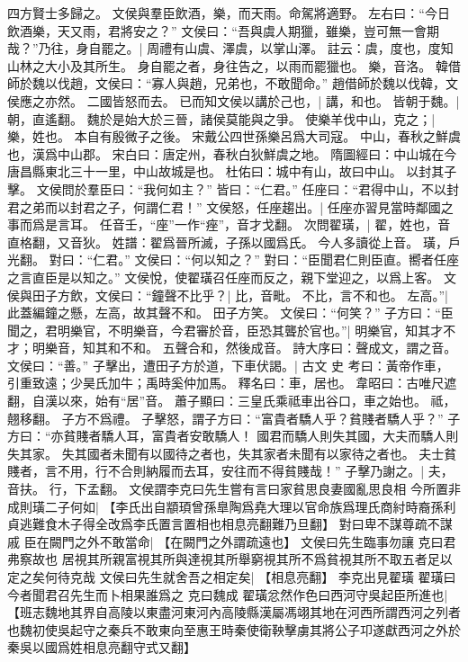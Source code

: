 四方賢士多歸之。
文侯與羣臣飲酒，樂，而天雨。命駕將適野。
左右曰：“今日飲酒樂，天又雨，君將安之？”
文侯曰：“吾與虞人期獵，雖樂，豈可無一會期哉？”乃往，身自罷之。|{
	周禮有山虞、澤虞，以掌山澤。
	註云：虞，度也，度知山林之大小及其所生。
	身自罷之者，身往告之，以雨而罷獵也。
	樂，音洛。
	}
韓借師於魏以伐趙，文侯曰：“寡人與趙，兄弟也，不敢聞命。”
趙借師於魏以伐韓，文侯應之亦然。
二國皆怒而去。
已而知文侯以講於己也，|{
	講，和也。
	}
皆朝于魏。|{
	朝，直遙翻。
	}
魏於是始大於三晉，諸侯莫能與之爭。
使樂羊伐中山，克之；|{
	樂，姓也。
	本自有殷微子之後。
	宋戴公四世孫樂呂爲大司寇。
	中山，春秋之鮮虞也，漢爲中山郡。
	宋白曰：唐定州，春秋白狄鮮虞之地。
	隋圖經曰：中山城在今唐昌縣東北三十一里，中山故城是也。
	杜佑曰：城中有山，故曰中山。
	}
以封其子擊。
文侯問於羣臣曰：“我何如主？”
皆曰：“仁君。”
任座曰：“君得中山，不以封君之弟而以封君之子，何謂仁君！”
文侯怒，任座趨出。|{
	任座亦習見當時鄰國之事而爲是言耳。
	任音壬，“座”一作“痤”，音才戈翻。
	}
次問翟璜，|{
	翟，姓也，音直格翻，又音狄。
	姓譜：翟爲晉所滅，子孫以國爲氏。
	今人多讀從上音。
	璜，戶光翻。
	}
對曰：“仁君。”
文侯曰：“何以知之？”
對曰：“臣聞君仁則臣直。嚮者任座之言直臣是以知之。”
文侯悅，使翟璜召任座而反之，親下堂迎之，以爲上客。
文侯與田子方飲，文侯曰：“鐘聲不比乎？|{
	比，音毗。
	不比，言不和也。
	}
左高。”|{
	此蓋編鐘之懸，左高，故其聲不和。
	}
田子方笑。
文侯曰：“何笑？”
子方曰：“臣聞之，君明樂官，不明樂音，今君審於音，臣恐其聾於官也。”|{
	明樂官，知其才不才；明樂音，知其和不和。
	五聲合和，然後成音。
	詩大序曰：聲成文，謂之音。
	}
文侯曰：“善。”
子擊出，遭田子方於道，下車伏謁。|{
	古文 史 考曰：黃帝作車，引重致遠；少昊氏加牛；禹時奚仲加馬。
	釋名曰：車，居也。
	韋昭曰：古唯尺遮翻，自漢以來，始有“居”音。
	蕭子顯曰：三皇氏乘祗車出谷口，車之始也。
	祗，翹移翻。
	}
子方不爲禮。
子擊怒，謂子方曰：“富貴者驕人乎？貧賤者驕人乎？”
子方曰：“亦貧賤者驕人耳，富貴者安敢驕人！
	國君而驕人則失其國，大夫而驕人則失其家。
	失其國者未聞有以國待之者也，失其家者未聞有以家待之者也。
	夫士貧賤者，言不用，行不合則納履而去耳，安往而不得貧賤哉！”
子擊乃謝之。|{
	夫，音扶。
	行，下孟翻。
	}
文侯謂李克曰先生嘗有言曰家貧思良妻國亂思良相
今所置非成則璜二子何如|{
	【李氏出自顓頊曾孫臯陶爲堯大理以官命族爲理氏商紂時裔孫利貞逃難食木子得全改爲李氏置言置相也相息亮翻難乃旦翻】
	}
對曰卑不謀尊疏不謀戚
臣在闕門之外不敢當命|{
	【在闕門之外謂疏遠也】
	}
文侯曰先生臨事勿讓
克曰君弗察故也
居視其所親富視其所與達視其所舉窮視其所不爲貧視其所不取五者足以定之矣何待克哉
文侯曰先生就舍吾之相定矣|{
	【相息亮翻】}
李克出見翟璜
翟璜曰今者聞君召先生而卜相果誰爲之
克曰魏成
翟璜忿然作色曰西河守吳起臣所進也|{
	【班志魏地其界自高陵以東盡河東河內高陵縣漢屬馮翊其地在河西所謂西河之列者也魏初使吳起守之秦兵不敢東向至惠王時秦使衛鞅擊虜其將公子卭遂獻西河之外於秦吳以國爲姓相息亮翻守式又翻】
	}
